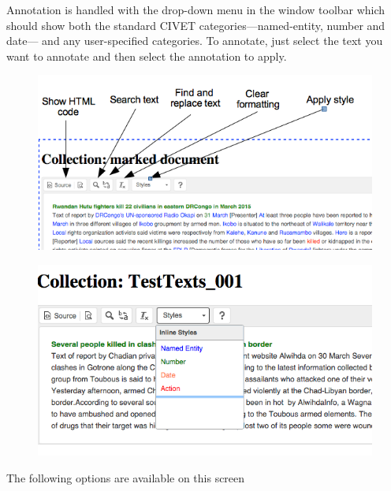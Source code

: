 \documentclass[letterpaper,10pt,english]{sphinxmanual}
\begin{document}
Annotation is handled with the  drop-down menu in the window
toolbar which should show both
the standard CIVET categories—named-entity, number and date— and any
user-specified categories. To annotate, just select the text you want to
annotate and then select the annotation to apply.
\begin{figure}[htbp]
\centering

\includegraphics{ckedit_menu.png}
\end{figure}
\begin{figure}[htbp]
\centering

\includegraphics{style_options.png}
\end{figure}

The following options are available on this screen
\end{document}
